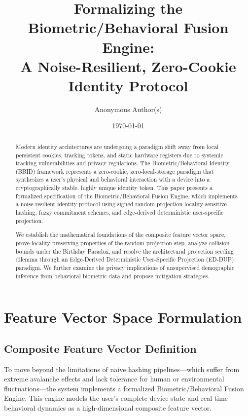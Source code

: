 \documentclass[11pt,twoside]{amsart}
\title[Biometric/Behavioral Fusion Engine]{Formalizing the Biometric/Behavioral Fusion Engine:\\A Noise-Resilient, Zero-Cookie Identity Protocol}
\author[Anonymous]{Anonymous Author(s)}
\date{\today}
\theoremstyle{plain}
\theoremstyle{definition}
\theoremstyle{remark}
\begin{document}
\begin{abstract}
Modern identity architectures are undergoing a paradigm shift away from local persistent cookies, tracking tokens, and static hardware registers due to systemic tracking vulnerabilities and privacy regulations. The Biometric/Behavioral Identity (BBID) framework represents a zero-cookie, zero-local-storage paradigm that synthesizes a user's physical and behavioral interaction with a device into a cryptographically stable, highly unique identity token. This paper presents a formalized specification of the Biometric/Behavioral Fusion Engine, which implements a noise-resilient identity protocol using signed random projection locality-sensitive hashing, fuzzy commitment schemes, and edge-derived deterministic user-specific projection.

We establish the mathematical foundations of the composite feature vector space, prove locality-preserving properties of the random projection step, analyze collision bounds under the Birthday Paradox, and resolve the architectural projection seeding dilemma through an Edge-Derived Deterministic User-Specific Projection (ED-DUP) paradigm. We further examine the privacy implications of unsupervised demographic inference from behavioral biometric data and propose mitigation strategies.
\end{abstract}

\maketitle

\tableofcontents

\section{Feature Vector Space Formulation}

\subsection{Composite Feature Vector Definition}

To move beyond the limitations of naive hashing pipelines---which suffer from extreme avalanche effects and lack tolerance for human or environmental fluctuations---the system implements a formalized Biometric/Behavioral Fusion Engine. This engine models the user's complete device state and real-time behavioral dynamics as a high-dimensional composite feature vector.
\end{document}

